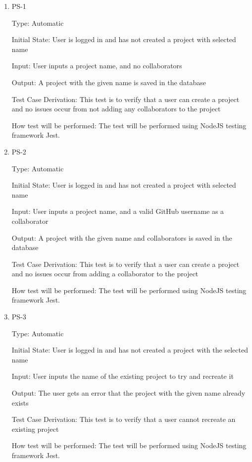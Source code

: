 \documentclass[12pt, titlepage]{article}
\begin{document}
	\begin{enumerate}
		
		\item{PS-1\\}
		
		Type: Automatic
		
		Initial State: User is logged in and has not created a project with selected name
		
		Input: User inputs a project name, and no collaborators
		
		Output: A project with the given name is saved in the database
		
		Test Case Derivation: This test is to verify that a user can create a project and no issues occur from not adding any collaborators to the project
		
		How test will be performed: The test will be performed using NodeJS testing framework Jest.
		
		\item{PS-2\\}
		
		Type: Automatic
		
		Initial State: User is logged in and has not created a project with selected name
		
		Input: User inputs a project name, and a valid GitHub username as a collaborator
		
		Output: A project with the given name and collaborators is saved in the database
		
		Test Case Derivation: This test is to verify that a user can create a project and no issues occur from adding a collaborator to the project
		
		How test will be performed: The test will be performed using NodeJS testing framework Jest.
		
		\item{PS-3\\}
		
		Type: Automatic
		
		Initial State: User is logged in and has not created a project with the selected name
		
		Input: User inputs the name of the existing project to try and recreate it
		
		Output: The user gets an error that the project with the given name already exists
		
		Test Case Derivation: This test is to verify that a user cannot recreate an existing project
		
		How test will be performed: The test will be performed using NodeJS testing framework Jest.
		

\end{enumerate}
\end{document}

